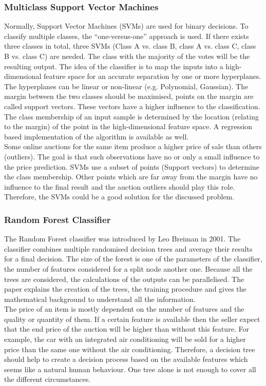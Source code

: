 \subsubsection{Multiclass Support Vector Machines}
Normally, Support Vector Machines (SVMs)\cite{svc} are used for binary decisions. To classify multiple classes, the ``one-versus-one'' approach is used. If there exists three classes in total, three SVMs (Class A vs. class B, class A vs. class C, class B vs. class C) are needed. The class with the majority of the votes will be the resulting output. The idea of the classifier is to map the inputs into a high-dimensional feature space for an accurate separation by one or more hyperplanes. The hyperplanes can be linear or non-linear (e.g. Polynomial, Gaussian). The margin between the two classes should be maximised, points on the margin are called support vectors. These vectors have a higher influence to the classification. The class membership of an input sample is determined by the location (relating to the margin) of the point in the high-dimensional feature space. A regression based implementation of the algorithm is available as well\cite{svr}.\\
Some online auctions for the same item produce a higher price of sale than others (outliers). The goal is that such observations have no or only a small influence to the price prediction. SVMs use a subset of points (Support vectors) to determine the class membership. Other points which are far away from the margin have no influence to the final result and the auction outliers should play this role. Therefore, the SVMs could be a good solution for the discussed problem. 
\subsubsection{Random Forest Classifier}
The Random Forest classifier was introduced by Leo Breiman in 2001\cite{breiman}. The classifier combines multiple randomised decision trees and average their results for a final decision. The size of the forest is one of the parameters of the classifier, the number of features considered for a split node another one. Because all the trees are considered, the calculations of the outputs can be parallelised. The paper explains the creation of the trees, the training procedure and gives the mathematical background to understand all the information. \\
The price of an item is mostly dependent on the number of features and the quality or quantity of them. If a certain feature is available then the seller expect that the end price of the auction will be higher than without this feature. For example, the car with an integrated air conditioning will be sold for a higher price than the same one without the air conditioning. Therefore, a decision tree should help to create a decision process based on the available features which seems like a natural human behaviour. One tree alone is not enough to cover all the different circumstances. 
